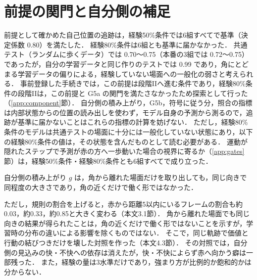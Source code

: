 \section{前提の関門と自分側の補足}\label{sup:self}
前提として確かめた自己位置の追跡は，経験50\%条件では6組すべてで基準（決定係数 0.80）を満たした．
経験80\%条件は6組とも基準に届かなかった．
共通テスト（ランダムに歩くデータ）では 0.70〜0.75（本番の3組では 0.72〜0.75）であったが，自分の学習データと同じ作りのテストでは 0.99 であり，角にとどまる学習データの偏りによる，経験していない場面への一般化の弱さと考えられる．
事前登録した手続きでは，この前提は段階IIへ進む条件であり，経験80\%条件の段階IIは，この前提と G5a の関門を満たさなかったため探索として行った（\ref{app:component}節）．
自分側の積み上がり，G5b，符号に従う分，照合の指標は内部状態からの位置の読み出しを使わず，モデル自身の予測から測るので，追跡が基準に届かないことはこれらの指標の計算を妨げない．
ただし，経験80\%条件のモデルは共通テストの場面に十分には一般化していない状態にあり，以下の経験80\%条件の値は，その状態を含んだものとして読む必要がある．
運動が隠れたステップで予測が赤の方へ一歩動いた場合の視界に寄るか（\ref{app:gates}節）は，経験50\%条件・経験80\%条件とも6組すべてで成り立った．

自分側の積み上がり $g$ は，角から離れた場面だけを取り出しても，同じ向きで同程度の大きさであり，角の近くだけで働く形ではなかった．

ただし，規則の割合を上げると，赤から距離5以内にいるフレームの割合も約0.03，約0.33，約0.85と大きく変わる（本文3.1節）．
角から離れた場面でも同じ向きの結果が得られたことは，角の近くだけで働く形ではないことを示すが，学習時の分布の違いによる影響を除くものではない．
そこで，同じ軌跡で価値と行動の結びつきだけを壊した対照を作った（本文4.3節）．
その対照では，自分側の見込みの快・不快への依存は消えたが，快・不快によらず赤へ向かう癖は一部残った．
また，経験の量は3水準だけであり，強まり方が比例的か飽和的かは分からない．
